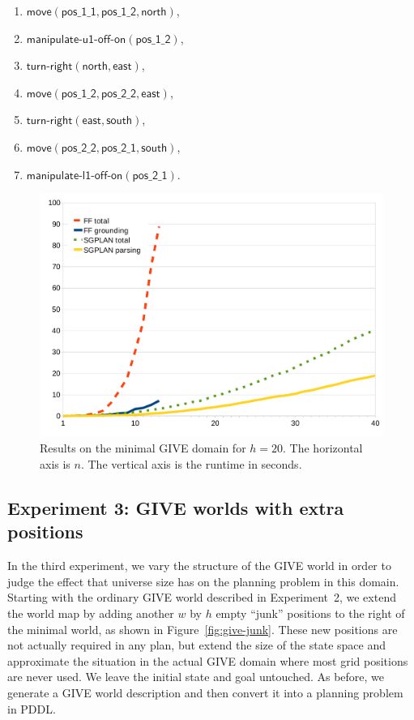 \begin{enumerate}
\item $\mathsf{move}(\mathsf{pos\_1\_1},\mathsf{pos\_1\_2}, \mathsf{north})$,
\item $\mathsf{manipulate}\textsf{-}\mathsf{u1}\textsf{-}\mathsf{off}\textsf{-}\mathsf{on}(\mathsf{pos\_1\_2})$,
\item $\mathsf{turn}\textsf{-}\mathsf{right}(\mathsf{north}, \mathsf{east})$,
\item $\mathsf{move}(\mathsf{pos\_1\_2}, \mathsf{pos\_2\_2},
  \mathsf{east})$,
\item $\mathsf{turn}\textsf{-}\mathsf{right}(\mathsf{east}, \mathsf{south})$,
\item $\mathsf{move}(\mathsf{pos\_2\_2}, \mathsf{pos\_2\_1}, \mathsf{south})$,
\item $\mathsf{manipulate}\textsf{-}\mathsf{l1}\textsf{-}\mathsf{off}\textsf{-}\mathsf{on}(\mathsf{pos\_2\_1})$.
\end{enumerate}


\begin{figure}[t]
  \centering
  \includegraphics[width=0.75\columnwidth]{graph-exp2}
  \caption{Results on the minimal GIVE
    domain for $h=20$. The horizontal axis is $n$. The vertical axis
    is the runtime in seconds.}
  \label{fig:give-runtime-minimal}
\end{figure}


\subsection{Experiment 3: GIVE worlds with extra positions}
\label{sec:experiment-3:-give}

In the third experiment, we vary the structure of the GIVE world in order
to judge the effect that universe size has on the planning problem in this
domain. Starting with the ordinary GIVE world described in Experiment~2, we
extend the world map by adding another $w$ by $h$ empty ``junk'' positions
to the right of the minimal world, as shown in Figure~\ref{fig:give-junk}.
These new positions are not actually required in any plan, but extend the
size of the state space and approximate the situation in the actual GIVE
domain where most grid positions are never used. We leave the initial state
and goal untouched. As before, we generate a GIVE world description and
then convert it into a planning problem in PDDL.

